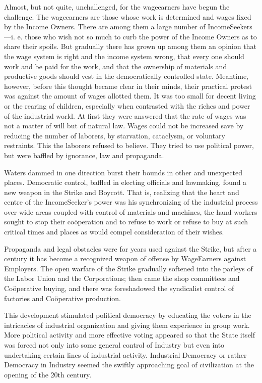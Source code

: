 \documentclass[letterpaper,10pt,english]{jupyterBook}
\begin{document}
\sphinxAtStartPar
Almost, but not quite, unchallenged, for the wage\sphinxhyphen{}earners have begun the challenge. The wage\sphinxhyphen{}earners are those whose work is determined and wages fixed by the Income Owners. There are among them a large number of Income\sphinxhyphen{}Seekers—i. e. those who wish not so much to curb the power of the Income Owners as to share their spoils. But gradually there has grown up among them an opinion that the wage system is right and the income system wrong, that every one should work and be paid for the work, and that the ownership of materials and productive goods should vest in the democratically controlled state. Meantime, however, before this thought became clear in their minds, their practical protest was against the amount of wages allotted them. It was too small for decent living or the rearing of children, especially when contrasted with the riches and power of the industrial world. At first they were answered that the rate of wages was not a matter of will but of natural law. Wages could not be increased save by reducing the number of laborers, by starvation, cataclysm, or voluntary restraints. This the laborers refused to believe. They tried to use political power, but were baffled by ignorance, law and propaganda.

\sphinxAtStartPar
Waters dammed in one direction burst their bounds in other and unexpected places. Democratic control, baffled in electing officials and law\sphinxhyphen{}making, found a new weapon in the Strike and Boycott. That is, realizing that the heart and centre of the Income\sphinxhyphen{}Seeker’s power was his synchronizing of the industrial process over wide areas coupled with control of materials and machines, the hand workers sought to stop their coöperation and to refuse to work or refuse to buy at such critical times and places as would compel consideration of their wishes.

\sphinxAtStartPar
Propaganda and legal obstacles were for years used against the Strike, but after a century it has become a recognized weapon of offense by Wage\sphinxhyphen{}Earners against Employers. The open warfare of the Strike gradually softened into the parleys of the Labor Union and the Corporations; then came the shop committees and Coöperative buying, and there was foreshadowed the syndicalist control of factories and Coöperative production.

\sphinxAtStartPar
This development stimulated political democracy by educating the voters in the intricacies of industrial organization and giving them experience in group work. More political activity and more effective voting appeared so that the State itself was forced not only into some general control of Industry but even into undertaking certain lines of industrial activity. Industrial Democracy or rather Democracy in Industry seemed the swiftly approaching goal of civilization at the opening of the 20th century.
\end{document}
